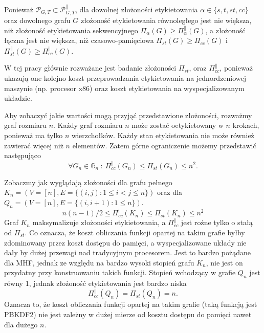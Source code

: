 Ponieważ $ \mathcal{P}_{G,T} \subset  \mathcal{P}_{G,T}^{ \parallel } $, dla dowolnej złożoności etykietowania $ \alpha \in \{s, t, st, cc \}$ oraz dowolnego grafu $G$ złożoność etykietowania równoległego jest nie większa, niż złożoność etykietowania sekwencyjnego $ \Pi_{ \alpha }(G) \geq \Pi_{ \alpha}^{\parallel}(G)$, a złożoność łączna jest nie większa, niż czasowo-pamięciowa  $ \Pi_{ st }(G) \geq \Pi_{ cc }(G)$ i $ \Pi_{ st }^{ \parallel }(G) \geq \Pi_{ cc }^{ \parallel }(G)$.

W tej pracy głównie rozważane jest badanie złożoności $\Pi_{ st }$, oraz $\Pi_{ cc }^{ \parallel }$, ponieważ ukazują one kolejno koszt przeprowadzania etykietowania na jednordzeniowej maszynie (np. procesor x86) oraz koszt etykietowania na wyspecjalizowanym układzie.

Aby zobaczyć jakie wartości mogą przyjąć przedstawione złożoności, rozważmy graf rozmiaru $n$.
Każdy graf rozmiaru $n$ może zostać oetykietowany w $n$ krokach, ponieważ ma tylko $n$ wierzchołków. Każdy stan etykietowania nie może również zawierać więcej niż $n$ elementów. Zatem górne ograniczenie możemy przedstawić następująco
$$ \forall G_{n} \in \mathbb{G}_{n} \ : \ \Pi_{ cc }^{ \parallel }(G_{n}) \leq \Pi_{ st }(G_{n}) \leq n^{2} . $$

Zobaczmy jak wyglądają złożoności dla grafu pełnego $K_{n} = (V = [n], E= \{
(i,j): 1 \leq i < j \leq n \})$ oraz dla $Q_{n} = (V = [n], E = \{ (i, i+1) : 1 \leq n \} )$.
$$ n(n - 1) / 2 \leq \Pi_{ cc }^{ \parallel }(K_{n}) \leq \Pi_{ st }(K_{n}) \leq n^2$$
Graf $K_{n}$ maksymalizuje złożoności etykietowania, a  $\Pi_{ cc }^{ \parallel }$ jest rożne tylko o stałą od $\Pi_{ st }$. Co oznacza, że koszt obliczania funkcji opartej na takim grafie byłby zdominowany przez koszt dostępu do pamięci, a wyspecjalizowane układy nie dały by dużej przewagi nad tradycyjnym procesorem. Jest to bardzo pożądane dla MHF, jednak ze względu na bardzo wysoki stopień grafu $K_{n}$, nie jest on przydatny przy konstruowaniu takich funkcji.
Stopień wchodzący w grafie $Q_{n}$ jest równy 1, jednak złożoność etykietowania jest bardzo niska
$$ \Pi_{ cc }^{ \parallel }(Q_{n}) = \Pi_{ st }(Q_{n}) = n. $$ 
Oznacza to, że koszt obliczania funkcji opartej na takim grafie (taką funkcją jest PBKDF2) nie jest zależny w dużej mierze od kosztu dostępu do pamięci nawet dla dużego $n$. 




